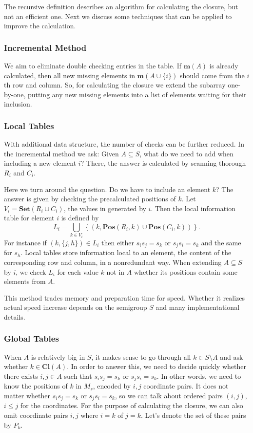 \documentclass{amsart}
\newcommand{\Set}{\mathbf{Set}}
\newcommand{\Miss}{\mathbf{m}}
\newcommand{\Closure}{\mathbf{Cl}}
\newcommand{\Pos}{\mathbf{Pos}}
\theoremstyle{plain}
\theoremstyle{definition}
\begin{document}
The recursive definition describes an algorithm for calculating the closure, but not an efficient one. Next we discuss some techniques that can be applied to improve the calculation.

\subsubsection{Incremental Method}
We aim to eliminate double checking entries in the table.
If $\Miss(A)$ is already calculated, then all new missing elements in $\Miss(A\cup\{i\})$ should come from the $i$th row and column.
So, for calculating the closure we extend the subarray one-by-one, putting any new missing elements into a list of elements waiting for their inclusion.

\subsubsection{Local Tables}
With additional data structure, the number of checks can be further reduced. 
In the incremental method we ask: Given $A\subseteq S$, what do we need to add when including a new element $i$?
There, the answer is calculated by scanning thorough $R_i$ and $C_i$.

Here we turn around the question.
Do we have to include an element $k$? The answer is given by checking the precalculated positions of $k$. 
Let $V_i=\Set(R_i\cup C_i)$, the values in generated by $i$. Then the  local information table for element $i$ is defined by
$$L_i=\bigcup_{k\in V_i}\left\{(k,\Pos(R_i,k)\cup\Pos(C_i,k))\right\}.$$
For instance if $(k,\{j,h\})\in L_i$ then either $s_is_j=s_k$ or $s_js_i=s_k$ and the same for $s_h$.
Local tables store information local to an element, the content of the corresponding row and column, in a nonredundant way.
When  extending $A\subseteq S$ by $i$, we check $L_i$ for each value $k$ not in $A$ whether its positions contain some elements from $A$. 

This method trades memory and preparation time for speed. Whether it realizes actual speed increase depends on the semigroup $S$ and many implementational details.

\subsubsection{Global Tables}
When $A$ is relatively big in $S$, it makes sense to go through all $k\in S\setminus A$ and ask whether $k\in\Closure(A)$. 
In order to answer this, we need to decide quickly whether there exists $i,j\in A$ such that $s_is_j=s_k$ or $s_js_i=s_k$.
In other words, we need to know the positions of $k$ in $M_s$, encoded by $i,j$ coordinate pairs.
It does not matter whether $s_is_j=s_k$ or $s_js_i=s_k$, so we can talk about ordered pairs $(i,j)$, $i\leq j$ for the coordinates. 
For the purpose of calculating the closure, we can also omit coordinate pairs $i,j$ where $i=k$ of $j=k$. 
Let's denote the set of these pairs by $P_k$.
\end{document}
